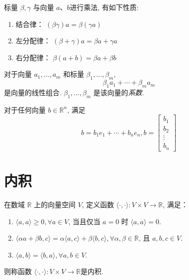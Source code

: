 \begin{theorem}
    标量 \( \beta, \gamma \) 与向量 \( a 、 b \)进行乘法, 有如下性质:
    \begin{enumerate}
        \item 结合律： \( (\beta \gamma) a=\beta(\gamma a) \)
        \item 左分配律： \( (\beta+\gamma) a=\beta a+\gamma a \)
        \item 右分配律： \( \beta(a+b)=\beta a+\beta b \)
    \end{enumerate}
\end{theorem}

\begin{definition}[线性组合]
    对于向量 \( a_{1}, \ldots, a_{m} \) 和标量 \( \beta_{1}, \ldots, \beta_{m} \),
    $$ \beta_{1} a_{1}+\cdots+\beta_{m} a_{m} $$
    是向量的线性组合. \( \beta_{1}, \ldots, \beta_{m} \) 是该向量的\textit{系数}. 
\end{definition}



    \begin{theorem}
        对于任何向量 \( b \in \mathbb{R}^{n} \), 满足
    $$ b=b_{1} e_{1}+\cdots+b_{n} e_{n}, b=\left[\begin{array}{c}b_{1} \\ b_{2} \\ \vdots \\ b_{n}\end{array}\right] $$
    \end{theorem}
    

\section{内积}

\begin{definition}[内积]
    在数域 \( \mathbb{R} \) 上的向量空间 \( V \), 定义函数 \( \langle\cdot,\cdot\rangle:V \times V \rightarrow \mathbb{R} \), 满足：

    \begin{enumerate}
        \item $ \langle{a}, {a}\rangle \geq 0, \forall {a} \in V $, 当且仅当 $a=0$ 时 $ \langle a, a\rangle=0 $.
        \item \( \langle\alpha {a}+\beta {b}, c\rangle=\alpha\langle{a}, c\rangle+\beta\langle{b}, c\rangle, \forall \alpha, \beta \in \mathbb{R} \), 且 \( {a}, {b}, c \in V \).
        \item \( \langle{a}, {b}\rangle=\langle{b}, {a}\rangle, \forall {a}, {b} \in V \).
    \end{enumerate}

    则称函数 \( \langle\cdot,\cdot\rangle:V \times V \rightarrow \mathbb{R} \)是内积. 
\end{definition}

